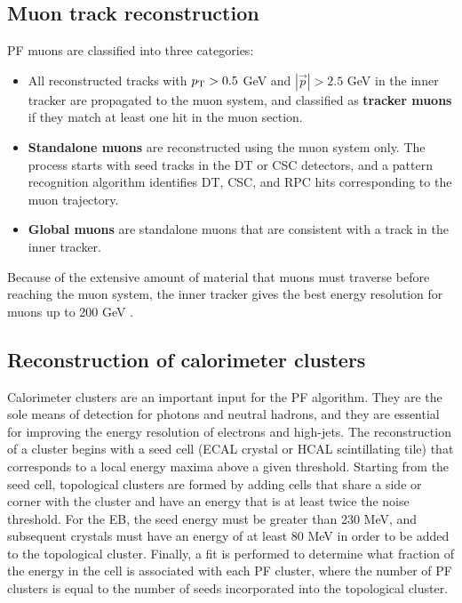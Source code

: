 \subsection{Muon track reconstruction}
\label{sec:muonTrackReco}
PF muons are classified into three categories:
\begin{itemize}
\item All reconstructed tracks with $p_{\mathrm{T}} > 0.5$ GeV and $|\vec{p}| > 2.5$ GeV in the inner tracker are propagated to the muon system, and classified as \textbf{tracker muons} if they match at least one hit in the muon section. 
\item \textbf{Standalone muons} are reconstructed using the muon system only. The process starts with seed tracks in the DT or CSC detectors, and a pattern recognition algorithm identifies DT, CSC, and RPC hits corresponding to the muon trajectory.
\item \textbf{Global muons} are standalone muons that are consistent with a track in the inner tracker. 
\end{itemize}

Because of the extensive amount of material that muons must traverse before reaching the muon system, the inner tracker gives the best energy resolution for muons up to 200 GeV \cite{ParticleFlow}.

\subsection{Reconstruction of calorimeter clusters}
\label{sec:clusterReco}
Calorimeter clusters are an important input for the PF algorithm. They are the sole means of detection for photons and neutral hadrons, and they are essential for improving the energy resolution of electrons and high-\pt jets. The reconstruction of a cluster begins with a seed cell (ECAL crystal or HCAL scintillating tile) that corresponds to a local energy maxima above a given threshold. Starting from the seed cell, topological clusters are formed by adding cells that share a side or corner with the cluster and have an energy that is at least twice the noise threshold. For the EB, the seed energy must be greater than 230 MeV, and subsequent crystals must have an energy of at least 80 MeV in order to be added to the topological cluster. Finally, a fit is performed to determine what fraction of the energy in the cell is associated with each PF cluster, where the number of PF clusters is equal to the number of seeds incorporated into the topological cluster.

